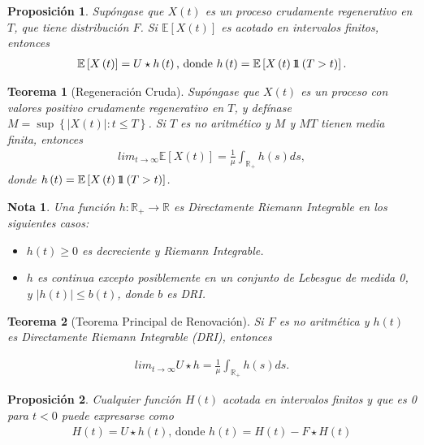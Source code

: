 \documentclass{article}
\newtheorem{Teo}{Teorema}
\newtheorem{Note}{Nota}
\newtheorem{Prop}{Proposición}
\newcommand{\rea}{\mathbb{R}}
\newcommand{\esp}{\mathbb{E}}
\newcommand{\indora}{\mbox{$1$\hspace{-0.8ex}$1$}}
\begin{document}
\begin{Prop}
Sup\'ongase que $X\left(t\right)$ es un proceso crudamente regenerativo en $T$, que tiene distribuci\'on $F$. Si $\esp\left[X\left(t\right)\right]$ es acotado en intervalos finitos, entonces
\begin{eqnarray*}
\esp\left[X\left(t\right)\right]=U\star h\left(t\right)\textrm{,  donde }h\left(t\right)=\esp\left[X\left(t\right)\indora\left(T>t\right)\right].
\end{eqnarray*}
\end{Prop}

\begin{Teo}[Regeneraci\'on Cruda]
Sup\'ongase que $X\left(t\right)$ es un proceso con valores positivo crudamente regenerativo en $T$, y def\'inase $M=\sup\left\{|X\left(t\right)|:t\leq T\right\}$. Si $T$ es no aritm\'etico y $M$ y $MT$ tienen media finita, entonces
\begin{eqnarray*}
lim_{t\rightarrow\infty}\esp\left[X\left(t\right)\right]=\frac{1}{\mu}\int_{\rea_{+}}h\left(s\right)ds,
\end{eqnarray*}
donde $h\left(t\right)=\esp\left[X\left(t\right)\indora\left(T>t\right)\right]$.
\end{Teo}


\begin{Note} Una funci\'on $h:\rea_{+}\rightarrow\rea$ es Directamente Riemann Integrable en los siguientes casos:
\begin{itemize}
\item[a)] $h\left(t\right)\geq0$ es decreciente y Riemann Integrable.
\item[b)] $h$ es continua excepto posiblemente en un conjunto de Lebesgue de medida 0, y $|h\left(t\right)|\leq b\left(t\right)$, donde $b$ es DRI.
\end{itemize}
\end{Note}

\begin{Teo}[Teorema Principal de Renovaci\'on]
Si $F$ es no aritm\'etica y $h\left(t\right)$ es Directamente Riemann Integrable (DRI), entonces

\begin{eqnarray*}
lim_{t\rightarrow\infty}U\star h=\frac{1}{\mu}\int_{\rea_{+}}h\left(s\right)ds.
\end{eqnarray*}
\end{Teo}

\begin{Prop}
Cualquier funci\'on $H\left(t\right)$ acotada en intervalos finitos y que es 0 para $t<0$ puede expresarse como
\begin{eqnarray*}
H\left(t\right)=U\star h\left(t\right)\textrm{,  donde }h\left(t\right)=H\left(t\right)-F\star H\left(t\right)
\end{eqnarray*}
\end{Prop}
\end{document}
